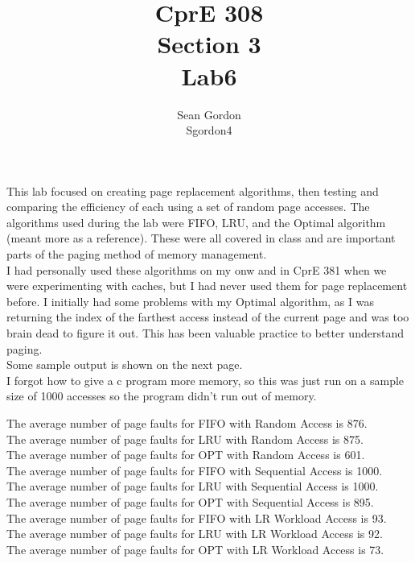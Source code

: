 \documentclass[12pt]{article}
\title{CprE 308\\Section 3\\Lab6}
\author{Sean Gordon\\Sgordon4}
\begin{document}
\maketitle

\noindent This lab focused on creating page replacement algorithms, then testing and comparing the efficiency of each using a set of random page accesses. The algorithms used during the lab were FIFO, LRU, and the Optimal algorithm (meant more as a reference). These were all covered in class and are important parts of the paging method of memory management.\\

\noindent I had personally used these algorithms on my onw and in CprE 381 when we were experimenting with caches, but I had never used them for page replacement before. I initially had some problems with my Optimal algorithm, as I was returning the index of the farthest access instead of the current page and was too brain dead to figure it out. This has been valuable practice to better understand paging.\\

\noindent Some sample output is shown on the next page.\\
I forgot how to give a c program more memory, so this was just run on a sample size of 1000 accesses so the program didn't run out of memory.\\
 
 
\pagebreak


\noindent
The average number of page faults for FIFO with Random Access is 876.\\
The average number of page faults for LRU with Random Access is 875.\\
The average number of page faults for OPT with Random Access is 601.\\

\noindent
The average number of page faults for FIFO with Sequential Access is 1000.\\
The average number of page faults for LRU with Sequential Access is 1000.\\
The average number of page faults for OPT with Sequential Access is 895.\\

\noindent
The average number of page faults for FIFO with LR Workload Access is 93.\\
The average number of page faults for LRU with LR Workload Access is 92.\\
The average number of page faults for OPT with LR Workload Access is 73.\\
\end{document}
